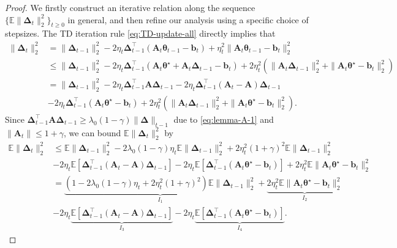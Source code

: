\begin{proof}
We firstly construct an iterative relation along the sequence $\{\mathbb{E}\|\bm{\Delta}_t\|_2^2\}_{t \geq 0}$ in general, and then refine our analysis using a specific choice of stepsizes. The TD iteration rule \eqref{eq:TD-update-all} directly implies that
\begin{align*}
\|\bm{\Delta}_{t}\|_2^2 &= \|\bm{\Delta}_{t-1}\|_2^2 -2\eta_t \bm{\Delta}_{t-1}^\top (\bm{A}_t \bm{\theta}_{t-1} - \bm{b}_t) + \eta_t^2 \|\bm{A}_t \bm{\theta}_{t-1} - \bm{b}_t\|_2^2 \\ 
&\leq \|\bm{\Delta}_{t-1}\|_2^2 -2\eta_t \bm{\Delta}_{t-1}^\top (\bm{A}_t \bm{\theta}^\star + \bm{A}_t \bm{\Delta}_{t-1} - \bm{b}_t) + 2\eta_t^2 (\|\bm{A}_t \bm{\Delta}_{t-1}\|_2^2 + \|\bm{A}_t \bm{\theta}^\star - \bm{b}_t\|_2^2)\\
&= \|\bm{\Delta}_{t-1}\|_2^2 -2\eta_t \bm{\Delta}_{t-1}^\top \bm{A \Delta}_{t-1} - 2\eta_t\bm{\Delta}_{t-1}^\top(\bm{A}_t-\bm{A})\bm{\Delta}_{t-1}\\ 
& - 2\eta_t \bm{\Delta}_{t-1}^\top (\bm{A}_t \bm{\theta}^\star - \bm{b}_t)+ 2\eta_t^2 (\|\bm{A}_t \bm{\Delta}_{t-1}\|_2^2 + \|\bm{A}_t \bm{\theta}^\star - \bm{b}_t\|_2^2).
\end{align*}
Since $\bm{\Delta}_{t-1}^\top \bm{A \Delta}_{t-1} \geq \lambda_0(1-\gamma)\|\bm{\Delta}\|_{t-1}$ due to \eqref{eq:lemma-A-1} and $\|\bm{A}_t\|\leq 1+\gamma$, we can bound $\mathbb{E}\|\bm{\Delta}_{t}\|_2^2$ by 
\begin{align}\label{eq:markov-L2-iter}
\mathbb{E}\|\bm{\Delta}_{t}\|_2^2 &\leq \mathbb{E}\|\bm{\Delta}_{t-1}\|_2^2 -2\lambda_0(1-\gamma) \eta_{t} \mathbb{E}\|\bm{\Delta}_{t-1}\|_2^2 +2\eta_t^2(1+\gamma)^2  \mathbb{E}\|\bm{\Delta}_{t-1}\|_2^2 \nonumber \\ 
&- 2\eta_t \mathbb{E}[\bm{\Delta}_{t-1}^\top(\bm{A}_t - \bm{A})\bm{\Delta}_{t-1}] - 2\eta_t \mathbb{E}[\bm{\Delta}_{t-1}^\top (\bm{A}_t \bm{\theta}^\star - \bm{b}_t)] + 2\eta_t^2 \mathbb{E}\|\bm{A}_t \bm{\theta}^\star - \bm{b}_t\|_2^2 \nonumber \\ 
&= \underset{I_1}{\underbrace{\left(1-2\lambda_0(1-\gamma)\eta_t + 2\eta_t^2(1+\gamma)^2\right) \mathbb{E}\|\bm{\Delta}_{t-1}\|_2^2 }}+ \underset{I_2}{\underbrace{2\eta_t^2 \mathbb{E}\|\bm{A}_t \bm{\theta}^\star - \bm{b}_t\|_2^2}} \nonumber \\ 
&- 2\eta_t\underset{I_3}{\underbrace{ \mathbb{E}[\bm{\Delta}_{t-1}^\top(\bm{A}_t - \bm{A})\bm{\Delta}_{t-1}]}} - 2 \eta_t \underset{I_4} {\underbrace{\mathbb{E}[\bm{\Delta}_{t-1}^\top (\bm{A}_t \bm{\theta}^\star - \bm{b}_t)]}}.
\end{align}


\end{proof}
